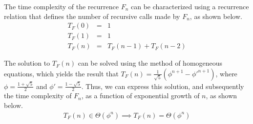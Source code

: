 \documentclass[11pt]{article}
\begin{document}
\begin{prob}{1}
\end{prob}
\begin{sol} 

The time complexity of the recurrence $F_{n}$ can be characterized using a recurrence relation that defines the number of recursive calls made by $F_{n}$, as shown below.
\begin{eqnarray*}
T_{F}(0) & = & 1 \\
T_{F}(1) & = & 1 \\
T_{F}(n) & = & T_{F}(n-1) + T_{F}(n-2)
\end{eqnarray*}

The solution to $T_{F}(n)$ can be solved using the method of homogeneous equations, which yields the result that $T_{F}(n) = \frac{1}{\sqrt{5}}(\phi^{n+1} - \phi'^{n+1})$, where $\phi = \frac{1 + \sqrt{5}}{2}$ and $\phi' = \frac{1 - \sqrt{5}}{2}$. Thus, we can express this solution, and subsequently the time complexity of $F_{n}$, as a function of exponential growth of $n$, as shown below. 
\begin{eqnarray*}
T_{F}(n) \in \Theta(\phi^{n}) \implies T_{F}(n) = \Theta(\phi^{n})
\end{eqnarray*}

\end{sol}
\end{document}
